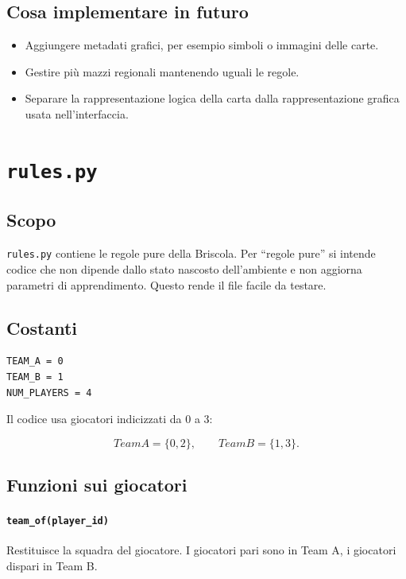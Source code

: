 \documentclass[11pt,a4paper]{article}
\begin{document}
\subsection{Cosa implementare in futuro}

\begin{itemize}
  \item Aggiungere metadati grafici, per esempio simboli o immagini delle carte.
  \item Gestire più mazzi regionali mantenendo uguali le regole.
  \item Separare la rappresentazione logica della carta dalla rappresentazione
  grafica usata nell'interfaccia.
\end{itemize}

\section{\texttt{rules.py}}

\subsection{Scopo}

\texttt{rules.py} contiene le regole pure della Briscola. Per ``regole pure''
si intende codice che non dipende dallo stato nascosto dell'ambiente e non
aggiorna parametri di apprendimento. Questo rende il file facile da testare.

\subsection{Costanti}

\begin{verbatim}
TEAM_A = 0
TEAM_B = 1
NUM_PLAYERS = 4
\end{verbatim}

Il codice usa giocatori indicizzati da 0 a 3:

\[
Team A = \{0,2\}, \qquad Team B = \{1,3\}.
\]

\subsection{Funzioni sui giocatori}

\paragraph{\texttt{team\_of(player\_id)}}

Restituisce la squadra del giocatore. I giocatori pari sono in Team A, i
giocatori dispari in Team B.
\end{document}
